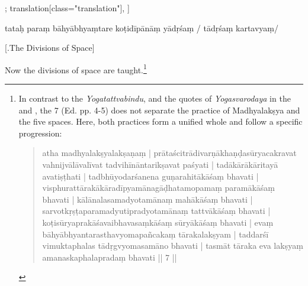 \begin{alignment}[
  texts=edition[class="edition"];
  translation[class="translation"],
  ]
\begin{edition}
\begin{prose}
tataḥ paraṃ bāhyābhyaṃtare koṭidīpānāṃ
yādṛśaṃ
/
tādṛśaṃ
kartavyaṃ/
\end{prose}
  \end{edition}
  \begin{translation}
    \centerline{\textrm{\small{[.\textsuperscript{}The Divisions of Space]}}}
    \bigskip
    \begin{tlate}
      \noindent
 Now the divisions of space are taught.\footnote{In contrast to the \textit{Yogatattvabindu},  and the quotes of \textit{Yogasvarodaya} in the  and , the  7 (Ed. pp. 4-5) does not separate the practice of Madhyalakṣya and the five spaces. Here, both practices form a unified whole and follow a specific progression:
\begin{quote}
  atha madhyalakṣyalakṣaṇaṃ | prātaścitrādivarṇākhaṇḍasūryacakravat vahnijvālāvalīvat tadvihīnāntarikṣavat paśyati | tadākārākāritayā avatiṣṭhati | tadbhūyodarśanena guṇarahitākāśaṃ bhavati | visphurattārakākāradīpyamānagāḍhatamopamaṃ paramākāśaṃ bhavati | kālānalasamadyotamānaṃ mahākāśaṃ bhavati | sarvotkṛṣṭaparamadyutipradyotamānaṃ tattvākāśaṃ bhavati | koṭisūryaprakāśavaibhavasaṃkāśaṃ sūryākāśaṃ bhavati | evaṃ bāhyābhyantarasthavyomapañcakaṃ tārakalakṣyam | taddarśī vimuktaphalas tādṛgvyomasamāno bhavati | tasmāt tāraka eva lakṣyaṃ amanaskaphalapradaṃ bhavati || 7 ||

\end{quote}}
\end{tlate}
\end{translation}
\end{alignment}
